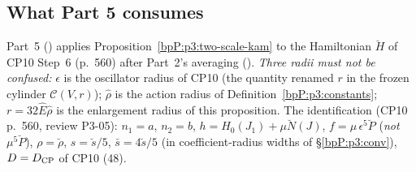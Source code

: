 \subsection{What Part 5 consumes}\label{bpP:p3:interface}

Part~5 () applies Proposition~\ref{bpP:p3:two-scale-kam} to the Hamiltonian $\breve H$ of CP10 Step~6 (p.~560) after Part~2's averaging (). \emph{Three radii must not be confused:} $\epsilon$ is the oscillator radius of CP10 (the quantity renamed $r$ in the frozen cylinder $\mathcal C(V,r)$); $\hat\rho$ is the action radius of Definition~\ref{bpP:p3:constants}; $r=32\hat E\hat\rho$ is the enlargement radius of this proposition. The identification (CP10 p.~560, review P3-05):
$n_1=a$, $n_2=b$, $h=H_0(J_1)+\mu\breve N(J)$, $f=\mu\,\epsilon^5\breve P$ (\emph{not} $\mu^5\breve P$), $\rho=\breve\rho$, $s=\breve s/5$, $\bar s=4\breve s/5$ (in coefficient-radius widths of \S\ref{bpP:p3:conv}), $D=D_{\rm CP}$ of CP10 (48).
